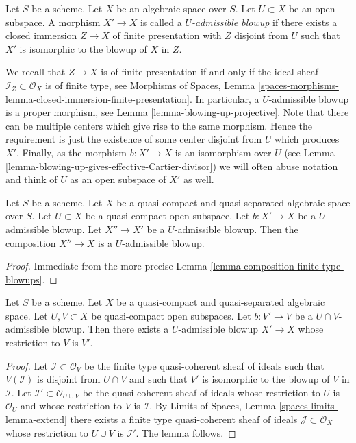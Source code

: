 \begin{definition}
\label{definition-admissible-blowup}
Let $S$ be a scheme. Let $X$ be an algebraic space over $S$.
Let $U \subset X$ be an open subspace. A morphism
$X' \to X$ is called a {\it $U$-admissible blowup} if there exists a
closed immersion $Z \to X$ of finite presentation with $Z$ disjoint from
$U$ such that $X'$ is isomorphic to the blowup of $X$ in $Z$.
\end{definition}

\noindent
We recall that $Z \to X$ is of finite presentation if and only if the
ideal sheaf $\mathcal{I}_Z \subset \mathcal{O}_X$ is of finite type, see
Morphisms of Spaces, Lemma
\ref{spaces-morphisms-lemma-closed-immersion-finite-presentation}.
In particular, a $U$-admissible blowup is a proper morphism, see
Lemma \ref{lemma-blowing-up-projective}.
Note that there can be multiple centers which give rise to the same morphism.
Hence the requirement is just the existence of some center disjoint from
$U$ which produces $X'$.
Finally, as the morphism $b : X' \to X$ is an isomorphism over $U$ (see
Lemma \ref{lemma-blowing-up-gives-effective-Cartier-divisor}) we will often
abuse notation and think of $U$ as an open subspace of $X'$ as well.

\begin{lemma}
\label{lemma-composition-admissible-blowups}
Let $S$ be a scheme.
Let $X$ be a quasi-compact and quasi-separated algebraic space over $S$.
Let $U \subset X$ be a quasi-compact open subspace.
Let $b : X' \to X$ be a $U$-admissible blowup.
Let $X'' \to X'$ be a $U$-admissible blowup.
Then the composition $X'' \to X$ is a $U$-admissible blowup.
\end{lemma}

\begin{proof}
Immediate from the more precise
Lemma \ref{lemma-composition-finite-type-blowups}.
\end{proof}

\begin{lemma}
\label{lemma-extend-admissible-blowups}
Let $S$ be a scheme.
Let $X$ be a quasi-compact and quasi-separated algebraic space.
Let $U, V \subset X$ be quasi-compact open subspaces.
Let $b : V' \to V$ be a $U \cap V$-admissible blowup.
Then there exists a $U$-admissible blowup $X' \to X$
whose restriction to $V$ is $V'$.
\end{lemma}

\begin{proof}
Let $\mathcal{I} \subset \mathcal{O}_V$ be the finite type
quasi-coherent sheaf of ideals such that $V(\mathcal{I})$ is
disjoint from $U \cap V$ and such that $V'$ is isomorphic to the
blowup of $V$ in $\mathcal{I}$. Let
$\mathcal{I}' \subset \mathcal{O}_{U \cup V}$ be the quasi-coherent
sheaf of ideals whose restriction to $U$ is $\mathcal{O}_U$ and
whose restriction to $V$ is $\mathcal{I}$.
By Limits of Spaces, Lemma \ref{spaces-limits-lemma-extend}
there exists a finite type quasi-coherent sheaf of ideals
$\mathcal{J} \subset \mathcal{O}_X$ whose restriction to $U \cup V$ is
$\mathcal{I}'$. The lemma follows.
\end{proof}

